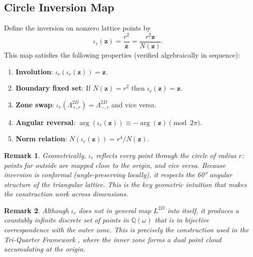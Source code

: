 \documentclass{article}
\newtheorem{remark}{Remark}
\begin{document}
\subsection{Circle Inversion Map}
Define the inversion on nonzero lattice points by
\[
\iota_r(\mathbf{z}) = \frac{r^2}{\bar{\mathbf{z}}} = \frac{r^2 \mathbf{z}}{N(\mathbf{z})}.
\]
This map satisfies the following properties (verified algebraically in sequence):
\begin{enumerate}
  \item \textbf{Involution}: \(\iota_r(\iota_r(\mathbf{z})) = \mathbf{z}\).
  \item \textbf{Boundary fixed set}: If \(N(\mathbf{z}) = r^2\) then \(\iota_r(\mathbf{z}) = \mathbf{z}\).
  \item \textbf{Zone swap}: \(\iota_r(\Lambda_{+,r}^{2D}) = \Lambda_{-,r}^{2D}\) and vice versa.
  \item \textbf{Angular reversal}: \(\arg(\iota_r(\mathbf{z})) \equiv -\arg(\mathbf{z}) \pmod{2\pi}\).
  \item \textbf{Norm relation}: \(N(\iota_r(\mathbf{z})) = r^4 / N(\mathbf{z})\).
\end{enumerate}
\begin{remark}
Geometrically, \(\iota_r\) reflects every point through the circle of radius \(r\): points far outside are mapped close to the origin, and vice versa. Because inversion is conformal (angle-preserving locally), it respects the 60° angular structure of the triangular lattice. This is the key geometric intuition that makes the construction work across dimensions.
\end{remark}
\begin{remark}
Although \(\iota_r\) does not in general map \(L^{2D}\) into itself, it produces a countably infinite discrete set of points in \(\mathbb{Q}(\omega)\) that is in bijective correspondence with the outer zone. This is precisely the construction used in the Tri-Quarter Framework \cite{Schmidt2025}, where the inner zone forms a dual point cloud accumulating at the origin.
\end{remark}
\end{document}
